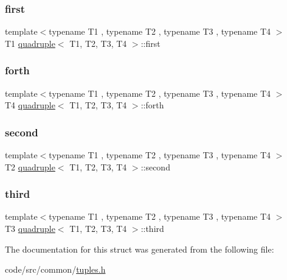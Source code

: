 \subsubsection{\texorpdfstring{first}{first}}
{\footnotesize\ttfamily template$<$typename T1 , typename T2 , typename T3 , typename T4 $>$ \\
T1 \hyperlink{structquadruple}{quadruple}$<$ T1, T2, T3, T4 $>$\+::first}

\mbox{\label{structquadruple_abab1a25fd1ed39d2605eaa9371de04ca}} 
\subsubsection{\texorpdfstring{forth}{forth}}
{\footnotesize\ttfamily template$<$typename T1 , typename T2 , typename T3 , typename T4 $>$ \\
T4 \hyperlink{structquadruple}{quadruple}$<$ T1, T2, T3, T4 $>$\+::forth}

\mbox{\label{structquadruple_aa93ca1ef60012d07903333d7b16bb32b}} 
\subsubsection{\texorpdfstring{second}{second}}
{\footnotesize\ttfamily template$<$typename T1 , typename T2 , typename T3 , typename T4 $>$ \\
T2 \hyperlink{structquadruple}{quadruple}$<$ T1, T2, T3, T4 $>$\+::second}

\mbox{\label{structquadruple_af1ada0ce5f85bbc7df2c5bfb113b442d}} 
\subsubsection{\texorpdfstring{third}{third}}
{\footnotesize\ttfamily template$<$typename T1 , typename T2 , typename T3 , typename T4 $>$ \\
T3 \hyperlink{structquadruple}{quadruple}$<$ T1, T2, T3, T4 $>$\+::third}



The documentation for this struct was generated from the following file\+:\begin{DoxyCompactItemize}
\item 
code/src/common/\hyperlink{tuples_8h}{tuples.\+h}\end{DoxyCompactItemize}

